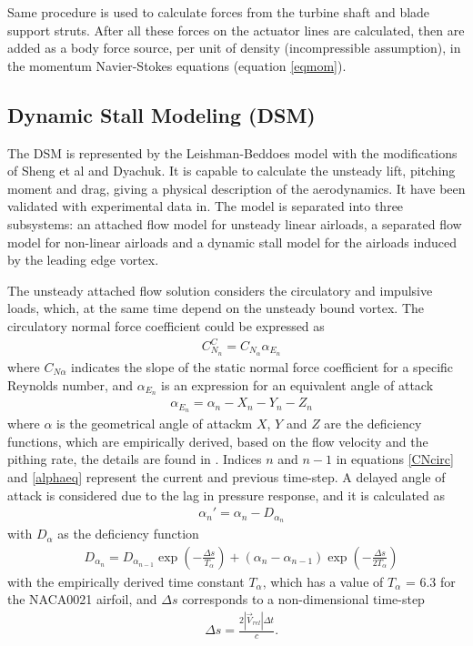 \documentclass[a4paper]{jpconf}
\begin{document}
Same procedure is used to calculate forces from the turbine shaft and blade support struts. After all these forces on the actuator lines are calculated, then are added as a body force source, per unit of density (incompressible assumption), in the momentum Navier-Stokes equations (equation \ref{eqmom}). 
 
\subsection{Dynamic Stall Modeling (DSM)} The DSM is represented by the Leishman-Beddoes
model\cite{leishman1986generalised} with the modifications of Sheng et
al\cite{sheng2008modified} and Dyachuk\cite{dyachuk}.
It is capable to calculate the unsteady lift,
pitching moment and drag, giving a physical description of the aerodynamics. It
have been validated with experimental data in\cite{leishman1989semi}.
The model is separated into three subsystems: an attached flow model for unsteady linear
airloads, a separated flow model for non-linear airloads and a dynamic stall
model for the airloads induced by the leading edge vortex.

The unsteady attached flow solution considers the circulatory and impulsive loads, which, at the same time depend on the unsteady bound vortex. The circulatory normal force coefficient could be expressed as
\begin{align}
& C_{N_n}^C = C_{N_\alpha} \alpha_{E_n}	\label{CNcirc}
\end{align}
where $C_{N \alpha}$ indicates the slope of the static normal force coefficient for a specific Reynolds number, and $\alpha_{E_n}$ is an expression for an equivalent angle of attack
\begin{align}
& \alpha_{E_n} = \alpha_n - X_n -Y_n - Z_n	\label{alphaeq}
\end{align}
where $\alpha$ is the geometrical angle of attackm $X$, $Y$ and $Z$ are the deficiency functions, which are empirically derived, based on the flow velocity and the pithing rate, the details are found in \cite{dyachuk2013dynamic}. Indices $n$ and $n-1$ in equations \ref{CNcirc} and \ref{alphaeq} represent the current and previous time-step. A delayed angle of attack is considered due to the lag in pressure response, and it is calculated as
\begin{align}
& {\alpha _n}' = {\alpha _n} - D_{\alpha _n}    	\label{alphadel}
\end{align}
with $D_\alpha$ as the deficiency function
\begin{align}
& D_{\alpha_n} = D_{\alpha_{n-1}} \exp \left( - \frac{\Delta s}{T_\alpha} \right) + (\alpha_n - \alpha_{n-1})\exp \left( - \frac{\Delta s}{2T_\alpha} \right) \label{defalpha}
\end{align}
with the empirically derived time constant $T_\alpha$, which has a value of $T_\alpha$ = 6.3 for the NACA0021 airfoil, and $\Delta s$ corresponds to a non-dimensional time-step
\begin{align}
& \Delta s = \frac{2 | \vec{V}_{rel} | \Delta t}{c}		.	\label{deltas}
\end{align}
\end{document}
